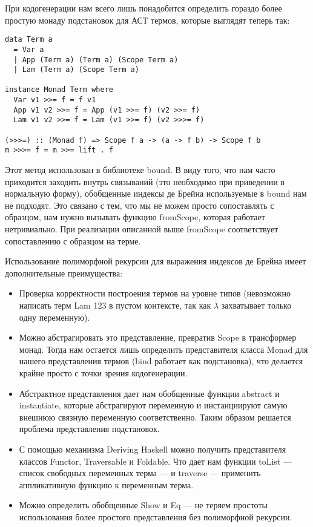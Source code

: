 При кодогенерации нам всего лишь понадобится определить гораздо более простую монаду подстановок для АСТ термов, которые выглядят теперь так:

\begin{lstlisting}[frame=single]
data Term a
  = Var a
  | App (Term a) (Term a) (Scope Term a)
  | Lam (Term a) (Scope Term a)

instance Monad Term where
  Var v1 >>= f = f v1
  App v1 v2 >>= f = App (v1 >>= f) (v2 >>= f)
  Lam v1 v2 >>= f = Lam (v1 >>= f) (v2 >>>= f)

(>>>=) :: (Monad f) => Scope f a -> (a -> f b) -> Scope f b
m >>>= f = m >>= lift . f
\end{lstlisting}

Этот метод использован в библиотеке bound\cite{bound}. В виду того, что нам часто приходится заходить внутрь связываний (это необходимо при приведении в нормальную форму), обобщенные индексы де Брейна используемые в bound нам не подходят. Это связано с тем, что мы не можем просто сопоставлять с образцом, нам нужно вызывать функцию fromScope, которая работает нетривиально. При реализации описанной выше fromScope соответствует сопоставлению с образцом на терме.

Использование полиморфной рекурсии для выражения индексов де Брейна имеет дополнительные преимущества:
\begin{itemize}
  \item Проверка корректности построения термов на уровне типов (невозможно написать терм Lam 123 в пустом контексте, так как $\lambda$ захватывает только одну переменную).
  \item Можно абстрагировать это представление, превратив Scope в трансформер монад. Тогда нам остается лишь определить представителя класса Monad для нашего представления термов (bind работает как подстановка), что делается крайне просто с точки зрения кодогенерации.
  \item Абстрактное представления дает нам обобщенные функции abstract и instantiate, которые абстрагируют переменную и инстанциируют самую внешнюю связную переменную соответственно. Таким образом решается проблема представления подстановок.
  \item С помощью механизма Deriving Haskell можно получить представителя классов Functor, Traversable и Foldable. Что дает нам функции toList --- список свободных переменных терма --- и traverse --- применить аппликативную функцию к переменным терма.
  \item Можно определить обобщенные Show и Eq --- не теряем простоты использования более простого представления без полиморфной рекурсии.
\end{itemize}

